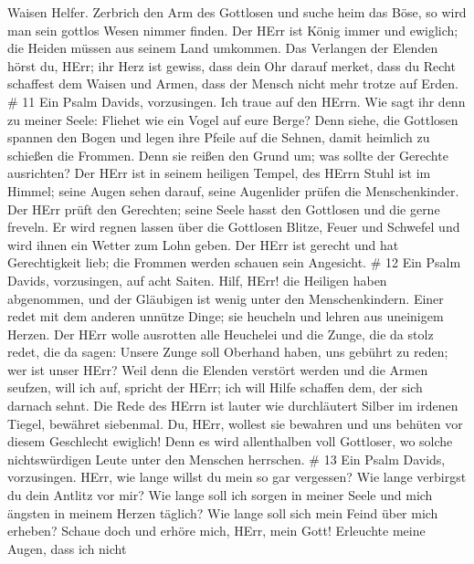 Waisen Helfer.  Zerbrich den Arm des Gottlosen und suche
heim das Böse, so wird man sein gottlos Wesen nimmer finden.
 Der HErr ist König immer und ewiglich; die Heiden müssen
aus seinem Land umkommen.  Das Verlangen der Elenden hörst
du, HErr; ihr Herz ist gewiss, dass dein Ohr darauf merket,
 dass du Recht schaffest dem Waisen und Armen, dass der
Mensch nicht mehr trotze auf Erden. \# 11  Ein Psalm Davids,
vorzusingen. Ich traue auf den HErrn. Wie sagt ihr denn zu meiner Seele:
Fliehet wie ein Vogel auf eure Berge?  Denn siehe, die
Gottlosen spannen den Bogen und legen ihre Pfeile auf die Sehnen, damit
heimlich zu schießen die Frommen.  Denn sie reißen den Grund
um; was sollte der Gerechte ausrichten?  Der HErr ist in
seinem heiligen Tempel, des HErrn Stuhl ist im Himmel; seine Augen sehen
darauf, seine Augenlider prüfen die Menschenkinder.  Der
HErr prüft den Gerechten; seine Seele hasst den Gottlosen und die gerne
freveln.  Er wird regnen lassen über die Gottlosen Blitze,
Feuer und Schwefel und wird ihnen ein Wetter zum Lohn geben.
 Der HErr ist gerecht und hat Gerechtigkeit lieb; die
Frommen werden schauen sein Angesicht. \# 12  Ein Psalm
Davids, vorzusingen, auf acht Saiten.  Hilf, HErr! die
Heiligen haben abgenommen, und der Gläubigen ist wenig unter den
Menschenkindern.  Einer redet mit dem anderen unnütze Dinge;
sie heucheln und lehren aus uneinigem Herzen.  Der HErr
wolle ausrotten alle Heuchelei und die Zunge, die da stolz redet,
 die da sagen: Unsere Zunge soll Oberhand haben, uns gebührt
zu reden; wer ist unser HErr?  Weil denn die Elenden
verstört werden und die Armen seufzen, will ich auf, spricht der HErr;
ich will Hilfe schaffen dem, der sich darnach sehnt.  Die
Rede des HErrn ist lauter wie durchläutert Silber im irdenen Tiegel,
bewähret siebenmal.  Du, HErr, wollest sie bewahren und uns
behüten vor diesem Geschlecht ewiglich!  Denn es wird
allenthalben voll Gottloser, wo solche nichtswürdigen Leute unter den
Menschen herrschen. \# 13  Ein Psalm Davids, vorzusingen.
 HErr, wie lange willst du mein so gar vergessen? Wie lange
verbirgst du dein Antlitz vor mir?  Wie lange soll ich
sorgen in meiner Seele und mich ängsten in meinem Herzen täglich? Wie
lange soll sich mein Feind über mich erheben?  Schaue doch
und erhöre mich, HErr, mein Gott! Erleuchte meine Augen, dass ich nicht
